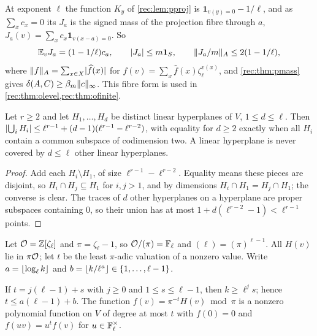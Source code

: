 \begin{remark}\label{rec:lem:oradon}
At exponent $\ell$ the function $K_y$ of \cref{rec:lem:pproj} is $\mathbf 1_{v(y)=0}-1/\ell$, and as $\sum_xc_x=0$ its $J_a$ is the
signed mass of the projection fibre through $a$, $J_a(v)=\sum_xc_x\mathbf 1_{v(x-a)=0}$. So
\[
 \mathbb E_vJ_a=(1-1/\ell)c_a,\qquad\lvert J_a\rvert\le m\mathbf 1_S,\qquad\lVert J_a/m\rVert_A\le2(1-1/\ell),
\]
where $\lVert f\rVert_A=\sum_{x\in X}\lvert\widehat f(x)\rvert$ for $f(v)=\sum_x\widehat f(x)\zeta_\ell^{v(x)}$, and \cref{rec:thm:pmass} gives
$\delta(A,C)\ge\beta_m\lVert c\rVert_\infty$. This fibre form is used in \cref{rec:thm:olevel,rec:thm:ofinite}.
\end{remark}

\begin{lemma}\label{rec:lem:ounion}
Let $r\ge2$ and let $H_1,\dots,H_d$ be distinct linear hyperplanes of $V$, $1\le d\le\ell$. Then
$\lvert\bigcup_iH_i\rvert\le\ell^{r-1}+(d-1)(\ell^{r-1}-\ell^{r-2})$, with equality for $d\ge2$ exactly when all $H_i$ contain a
common subspace of codimension two. A linear hyperplane is never covered by $d\le\ell$ other linear
hyperplanes.
\end{lemma}

\begin{proof}
Add each $H_i\setminus H_1$, of size $\ell^{r-1}-\ell^{r-2}$. Equality means these pieces are disjoint, so
$H_i\cap H_j\subseteq H_1$ for $i,j>1$, and by dimensions $H_i\cap H_1=H_j\cap H_1$; the converse is clear. The traces of $d$
other hyperplanes on a hyperplane are proper subspaces containing $0$, so their union has at most
$1+d(\ell^{r-2}-1)<\ell^{r-1}$ points.
\end{proof}

Let $\mathcal{O}=\mathbb{Z}[\zeta_\ell]$ and $\pi=\zeta_\ell-1$, so $\mathcal{O}/(\pi)=\mathbb{F}_\ell$ and $(\ell)=(\pi)^{\ell-1}$. All $H(v)$ lie in $\pi\mathcal{O}$; let $t$ be the
least $\pi$-adic valuation of a nonzero value. Write $a=\lfloor\log_\ell k\rfloor$ and $b=\lfloor k/\ell^a\rfloor\in\{1,\dots,\ell-1\}$.

\begin{lemma}\label{rec:lem:ored}
If $t=j(\ell-1)+s$ with $j\ge0$ and $1\le s\le\ell-1$, then $k\ge\ell^js$; hence $t\le a(\ell-1)+b$. The function
$f(v)=\pi^{-t}H(v)\bmod\pi$ is a nonzero polynomial function on $V$ of degree at most $t$ with $f(0)=0$ and
$f(uv)=u^tf(v)$ for $u\in\mathbb{F}_\ell^\times$.
\end{lemma}

